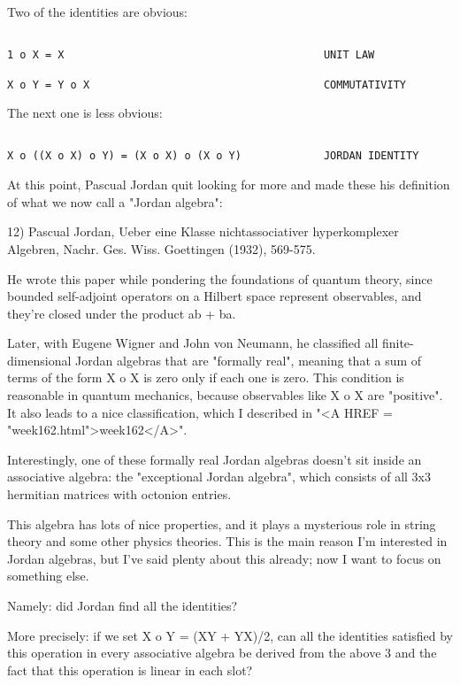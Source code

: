 Two of the identities are obvious:


\begin{verbatim}

1 o X = X                                         UNIT LAW

X o Y = Y o X                                     COMMUTATIVITY 
\end{verbatim}
    
The next one is less obvious:


\begin{verbatim}

X o ((X o X) o Y) = (X o X) o (X o Y)             JORDAN IDENTITY
\end{verbatim}
    
At this point, Pascual Jordan quit looking for more and made these 
his definition of what we now call a "Jordan algebra":

12) Pascual Jordan, Ueber eine Klasse nichtassociativer hyperkomplexer 
Algebren, Nachr. Ges. Wiss. Goettingen (1932), 569-575.   

He wrote this paper while pondering the foundations of quantum theory,
since bounded self-adjoint operators on a Hilbert space represent
observables, and they're closed under the product ab + ba.

Later, with Eugene Wigner and John von Neumann, he classified all
finite-dimensional Jordan algebras that are "formally real", meaning
that a sum of terms of the form X o X is zero only if each one is zero.
This condition is reasonable in quantum mechanics, because observables
like X o X are "positive".  It also leads to a nice classification,
which I described in "<A HREF = "week162.html">week162</A>".

Interestingly, one of these formally real Jordan algebras doesn't
sit inside an associative algebra: the "exceptional Jordan algebra", 
which consists of all 3x3 hermitian matrices with octonion entries.

This algebra has lots of nice properties, and it plays a mysterious 
role in string theory and some other physics theories.  This is the 
main reason I'm interested in Jordan algebras, but I've said plenty 
about this already; now I want to focus on something else.

Namely: did Jordan find all the identities?  

More precisely: if we set X o Y = (XY + YX)/2, can all the identities 
satisfied by this operation in every associative algebra be derived 
from the above 3 and the fact that this operation is linear in each slot?

